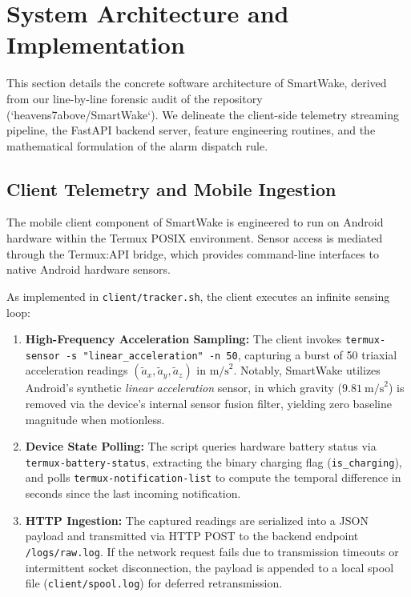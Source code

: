 \documentclass[journal,11pt,onecolumn]{IEEEtran}
\begin{document}
\section{System Architecture and Implementation}
\label{sec:system_design}\hypertarget{sec:system_design}{}

This section details the concrete software architecture of SmartWake, derived from our line-by-line forensic audit of the repository (`heavens7above/SmartWake`). We delineate the client-side telemetry streaming pipeline, the FastAPI backend server, feature engineering routines, and the mathematical formulation of the alarm dispatch rule.

\subsection{Client Telemetry and Mobile Ingestion}
The mobile client component of SmartWake is engineered to run on Android hardware within the Termux POSIX environment. Sensor access is mediated through the Termux:API bridge, which provides command-line interfaces to native Android hardware sensors.

As implemented in \texttt{client/tracker.sh}, the client executes an infinite sensing loop:
\begin{enumerate}[leftmargin=*]
    \item \textbf{High-Frequency Acceleration Sampling:} The client invokes \texttt{termux-sensor -s "linear\_acceleration" -n 50}, capturing a burst of 50 triaxial acceleration readings $(\tilde{a}_x, \tilde{a}_y, \tilde{a}_z)$ in $\text{m/s}^2$. Notably, SmartWake utilizes Android's synthetic \textit{linear acceleration} sensor, in which gravity ($9.81~\text{m/s}^2$) is removed via the device's internal sensor fusion filter, yielding zero baseline magnitude when motionless.
    \item \textbf{Device State Polling:} The script queries hardware battery status via \texttt{termux-battery-status}, extracting the binary charging flag (\texttt{is\_charging}), and polls \texttt{termux-notification-list} to compute the temporal difference in seconds since the last incoming notification.
    \item \textbf{HTTP Ingestion:} The captured readings are serialized into a JSON payload and transmitted via HTTP POST to the backend endpoint \texttt{/logs/raw.log}. If the network request fails due to transmission timeouts or intermittent socket disconnection, the payload is appended to a local spool file (\texttt{client/spool.log}) for deferred retransmission.
\end{enumerate}
\end{document}
